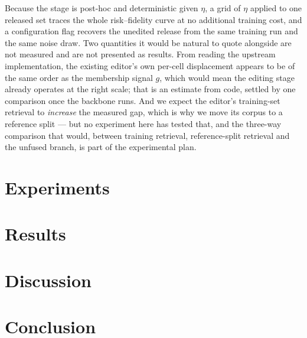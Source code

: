 \documentclass[journal]{IEEEtran}
\begin{document}
Because the stage is post-hoc and deterministic given $\eta$, a grid of $\eta$ applied to one
released set traces the whole risk--fidelity curve at no additional training cost, and a
configuration flag recovers the unedited release from the same training run and the same
noise draw. Two quantities it would be natural to quote alongside are not measured and are
not presented as results. From reading the upstream implementation, the existing editor's own
per-cell displacement appears to be of the same order as the membership signal $g$, which
would mean the editing stage already operates at the right scale; that is an estimate from
code, settled by one comparison once the backbone runs. And we expect the editor's
training-set retrieval to \emph{increase} the measured gap, which is why we move its corpus
to a reference split --- but no experiment here has tested that, and the three-way comparison
that would, between training retrieval, reference-split retrieval and the unfused branch, is
part of the experimental plan.

\section{Experiments}
\section{Results}
\section{Discussion}
\section{Conclusion}



\end{document}
